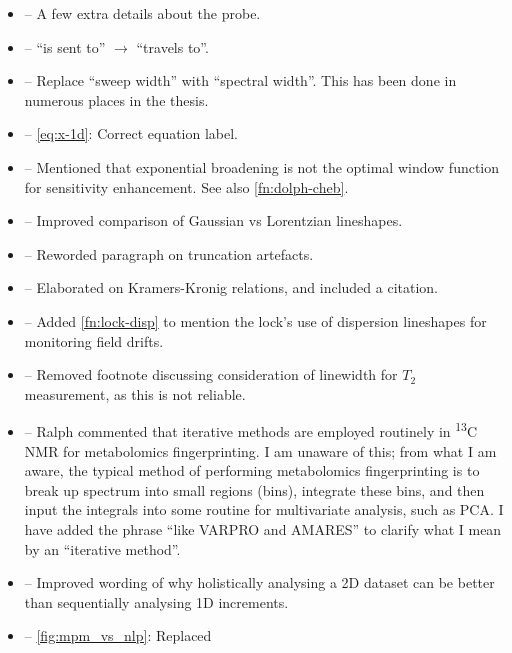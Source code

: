 \documentclass[12pt]{article}
\begin{document}
\begin{itemize}
        \item {} -- A few extra details about the probe.
        \item {} -- ``is sent to'' $\rightarrow$ ``travels to''.
        \item {} -- Replace ``sweep width'' with ``spectral
            width''. This has been done in numerous places in the thesis.
        \item {} -- \cref{eq:x-1d}: Correct equation label.
        \item {} -- Mentioned that exponential broadening
            is not the optimal window function for sensitivity enhancement. See
            also \cref{fn:dolph-cheb}.
        \item {} -- Improved comparison of Gaussian vs
            Lorentzian lineshapes.
        \item {} -- Reworded paragraph on truncation artefacts.
        \item {} -- Elaborated on Kramers-Kronig
            relations, and included a citation.
        \item {} -- Added \cref{fn:lock-disp} to mention
            the lock's use of dispersion lineshapes for monitoring field
            drifts.
        \item {} -- Removed footnote discussing
            consideration of linewidth for $T_2$ measurement, as this is not
            reliable.
        \item {} -- Ralph commented that iterative methods
            are employed routinely in \textsuperscript{13}C NMR for
            metabolomics fingerprinting. I am unaware of this; from what I am
            aware, the typical method of performing metabolomics fingerprinting
            is to break up spectrum into small regions (bins), integrate these
            bins, and then input the integrals into some routine for multivariate
            analysis, such as PCA. I have added the phrase ``like VARPRO and
            AMARES'' to clarify what I mean by an ``iterative method''.
        \item {} -- Improved wording of why holistically
            analysing a 2D dataset can be better than sequentially analysing 1D
            increments.
        \item {} -- \cref{fig:mpm_vs_nlp}: Replaced

\end{itemize}
\end{document}
